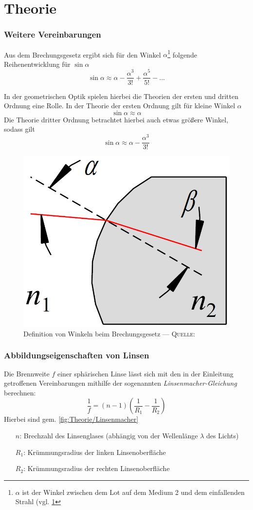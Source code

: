 \documentclass[../protokoll.tex]{subfiles}
\begin{document}
\part{Theorie}
\section{Weitere Vereinbarungen}
Aus dem Brechungsgesetz ergibt sich für den Winkel $\alpha$\footnote{$\alpha$ ist der Winkel zwischen dem Lot auf dem Medium 2 und dem einfallenden Strahl (vgl. \cref{fig:Brechungsgesetz}}
folgende Reihenentwicklung für $\sin \alpha$
\begin{equation}
    \sin \alpha \approx \alpha - \dfrac{\alpha^3}{3!} + \dfrac{\alpha^5}{5!} - ...
\end{equation}

In der geometrischen Optik spielen hierbei die Theorien der ersten und dritten Ordnung eine Rolle.
In der Theorie der ersten Ordnung gilt für kleine Winkel $\alpha$
\begin{equation}\label{eq:theorie-ordnung-1}
    \sin \alpha \approx \alpha
\end{equation}
Die Theorie dritter Ordnung betrachtet hierbei auch etwas größere Winkel, sodass gilt
\begin{equation}\label{eq:theorie-ordnung-3}
    \sin \alpha \approx \alpha - \dfrac{\alpha^3}{3!}
\end{equation}

\begin{figure}[H]
    \centering
    \includegraphics[width=0.2\linewidth]{2023-05-08 - V4 - Geometrische Optik, optische Abbildung und Aberrationen/images/theory/brechungsgesetz.png}
    \caption{Definition von Winkeln beim Brechungsgesetz --- \textsc{Quelle}: \cite[S. 43, Abb. 1]{script}}
    \label{fig:Brechungsgesetz}
\end{figure}
\section{Abbildungseigenschaften von Linsen}
Die Brennweite $f$ einer sphärischen Linse lässt sich mit den in der Einleitung
getroffenen Vereinbarungen mithilfe der sogenannten \textsl{Linsenmacher-Gleichung}
berechnen:
\begin{equation}\label{eq:Linsenmacher-Gleichung}
    \dfrac{1}{f} = (n - 1) \left( \dfrac{1}{R_1} - \dfrac{1}{R_2}\right)
\end{equation}
Hierbei sind gem. \cref{fig:Theorie/Linsenmacher}
\begin{itemize}[noitemsep,leftmargin=4em]
    \item[$n$:] Brechzahl des Linsenglases (abhängig von der Wellenlänge $\lambda$ des Lichts)
    \item[$R_1$:] Krümmungsradius der linken Linsenoberfläche
    \item[$R_2$:] Krümmungsradius der rechten Linsenoberfläche
\end{itemize}
\end{document}
